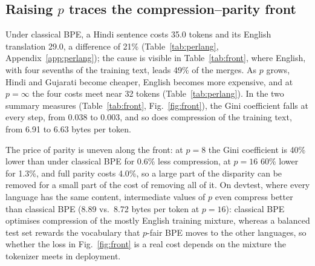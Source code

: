 \subsection{Raising $p$ traces the compression--parity front}

Under classical BPE, a Hindi sentence costs 35.0 tokens and its English translation 29.0, a
difference of 21\% (Table~\ref{tab:perlang}, Appendix~\ref{app:perlang}); the cause is
visible in Table~\ref{tab:front}, where English, with four sevenths of the training text,
leads 49\% of the merges. As $p$ grows, Hindi and Gujarati become cheaper, English becomes more expensive, and at
$p=\infty$ the four costs meet near 32 tokens (Table~\ref{tab:perlang}). In the two summary
measures (Table~\ref{tab:front}, Fig.~\ref{fig:front}), the Gini coefficient falls at every
step, from 0.038 to 0.003, and so does compression of the training text, from 6.91 to 6.63
bytes per token.

The price of parity is uneven along the front: at $p=8$ the Gini coefficient is 40\% lower
than under classical BPE for 0.6\% less compression, at $p=16$ 60\% lower for 1.3\%, and full
parity costs 4.0\%, so a large part of the disparity can be removed for a small part of the
cost of removing all of it. On devtest, where every language has
the same content, intermediate values of $p$ even compress better than classical BPE (8.89
vs.\ 8.72 bytes per token at $p=16$): classical BPE optimises compression of the mostly
English training mixture, whereas a balanced test set rewards the vocabulary that $p$-fair
BPE moves to the other languages, so whether the loss in Fig.~\ref{fig:front} is a real cost
depends on the mixture the tokenizer meets in deployment.

